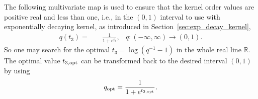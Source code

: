 \documentclass{iitthesis}          %
\newcommand{\reals}{\mathbb{R}}
\newcommand\secref{Section~\ref}
\begin{document}
The following multivariate map is used to ensure that the kernel order values are positive real and less than one, i.e., in the $(0,1)$ interval to use with exponentially decaying kernel, as introduced in \secref{sec:exp_decay_kernel},
\begin{align*}
q(t_3) = & \quad \frac{1}{1 + e^{t_3}}, & q: (-\infty, \infty) \to (0, 1).
\end{align*}
So one may search for the optimal $t_3 = \log(q^{-1}-1)$ in the whole real line $\reals$.
The optimal value $t_{3, \textup{opt}}$ can be transformed back to the desired interval $(0,1)$ by using
\begin{align*}
q_{\textup{opt}} = \frac{1}{1 + e^{t_{3, \textup{opt}}}}.
\end{align*}
\end{document}
